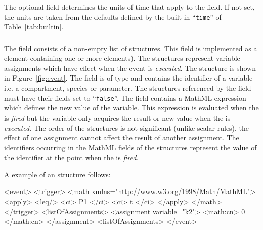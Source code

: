 \documentclass[10pt,twocolumntoc]{cekarticle}
\newcommand{\vref}[1]{\ref{#1}}
\begin{document}
\subsubsection{}
The optional field  determines the units of time
that apply to the  field. If not set, the units are
taken from the defaults defined by the built-in ``\texttt{time}''
of Table~\vref{tab:builtin}.

\subsubsection{}
The  field consists of a non-empty list of
 structures.  This field is implemented as a
 element containing one or more
 elements).  The 
structures represent variable assignments which have effect when
the event is \emph{executed}. The  structure is
shown in Figure~\ref{fig:event}. The  field is of
type  and contains the identifier of a variable i.e. a
compartment, species or parameter.  The structures referenced by
the  field must have their 
fields set to ``\texttt{false}''.  The  field
contains a MathML expression which defines the new value of the
variable.  This expression is evaluated when the  is
\emph{fired} but the variable only acquires the result or new
value when the  is \emph{executed}.  The order of the
 structures is not significant (unlike
scalar rules), the effect of one assignment cannot affect the
result of another assignment.  The identifiers occurring in the
MathML  fields of the 
structures represent the value of the identifier at the point when
the  is \emph{fired}.

A example of an  structure follows:

\begin{example}
<event>
    <trigger>
        <math xmlns="http://www.w3.org/1998/Math/MathML">
            <apply>
                <leq/>
                <ci> P1 </ci>
                <ci> t </ci>
            </apply>
        </math>
    </trigger>
    <listOfAssignments>
        <assignment variable="k2">
            <math:cn> 0 </math:cn>
        </assignment>
    <listOfAssignments>
</event>
\end{example}
\end{document}
